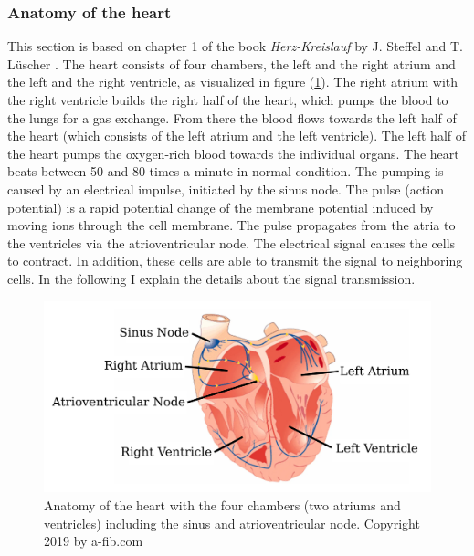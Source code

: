 \subsubsection{Anatomy of the heart}
This section is based on chapter 1 of the book \textit{Herz-Kreislauf} by J. Steffel and  T. Lüscher \cite{kreislauf}.
The heart consists of four chambers, the left and the right atrium and the left and the right ventricle, as visualized in figure (\ref{fig:heart_anatomy}). The right atrium with the right ventricle builds the right half of the heart, which pumps the blood to the lungs for a gas exchange. From there the blood flows towards the left half of the heart (which consists of the left atrium and the left ventricle). The left half of the heart pumps the oxygen-rich blood towards the individual organs. The heart beats between 50 and 80 times a minute in normal condition. The pumping is caused by an electrical impulse, initiated by the sinus node. The pulse (action potential) is a rapid potential change of the membrane potential induced by moving ions through the cell membrane. The pulse propagates from the atria to the ventricles via the atrioventricular node. The electrical signal causes the cells to contract. In addition, these cells are able to transmit the signal to neighboring cells. In the following I explain the details about the signal transmission.

\begin{figure}[ht]
    \center
    \includegraphics[width=1.0\textwidth]{figures/heart_physiology.png}
	\caption{Anatomy of the heart with the four chambers (two atriums and ventricles) including the sinus and atrioventricular node. Copyright 2019 by a-fib.com}
	\label{fig:heart_anatomy}
\end{figure}

